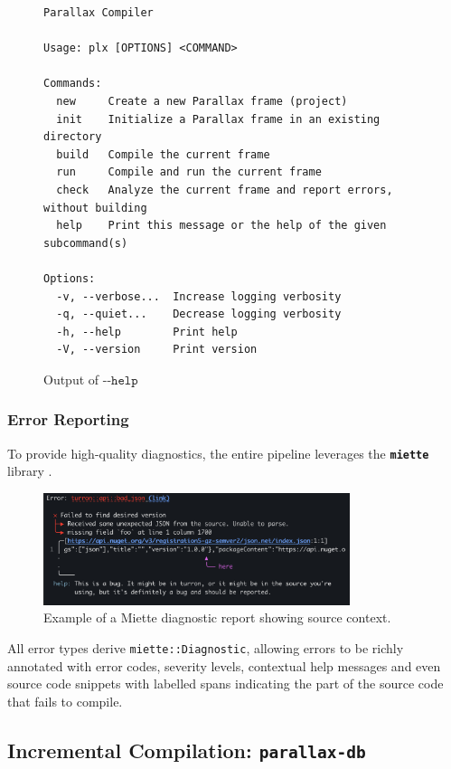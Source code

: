 \begin{figure}[h!]
    \centering
    \begin{verbatim}
Parallax Compiler

Usage: plx [OPTIONS] <COMMAND>

Commands:
  new     Create a new Parallax frame (project)
  init    Initialize a Parallax frame in an existing directory
  build   Compile the current frame
  run     Compile and run the current frame
  check   Analyze the current frame and report errors, without building
  help    Print this message or the help of the given subcommand(s)

Options:
  -v, --verbose...  Increase logging verbosity
  -q, --quiet...    Decrease logging verbosity
  -h, --help        Print help
  -V, --version     Print version
    \end{verbatim}
    \caption{Output of $\texttt{-{}-help}$}
    \label{fig:impl_cli_help}
\end{figure}

\subsubsection{Error Reporting}

To provide high-quality diagnostics, the entire pipeline leverages the \textbf{\texttt{miette}} library \cite{Miette}.


\begin{figure}[h!]
    \centering
    \includegraphics[width=0.8\textwidth]{images/miette-example.png}
    \caption{Example of a Miette diagnostic report showing source context.}
    \label{fig:impl_miette_example}
\end{figure}

All error types derive \texttt{miette::Diagnostic}, allowing errors to be richly annotated with error codes, severity levels, contextual help messages and even source code snippets with labelled spans indicating the part of the source code that fails to compile.

\subsection{Incremental Compilation: \texttt{parallax-db}}

